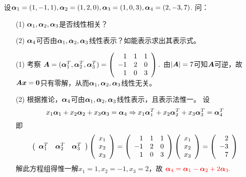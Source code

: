 \begin{frame}
\begin{li}
  设$\boldsymbol{\alpha}_1=(1,-1,1),\boldsymbol{\alpha}_2=(1,2,0),\boldsymbol{\alpha}_3=(1,0,3),\boldsymbol{\alpha}_4=(2,-3,7)$.  问：
  \begin{itemize}
  \item[(1)]$\boldsymbol{\alpha}_1,\boldsymbol{\alpha}_2,\boldsymbol{\alpha}_3$是否线性相关？
  \item[(2)]$\boldsymbol{\alpha}_4$可否由$\boldsymbol{\alpha}_1,\boldsymbol{\alpha}_2,\boldsymbol{\alpha}_3$线性表示？如能表示求出其表示式。
  \end{itemize}
\end{li} \pause 
\begin{jie}
\begin{itemize}
\item[(1)]    考察
  $
  \boldsymbol{A} = (\boldsymbol{\alpha}_1^T, \boldsymbol{\alpha}_2^T, \boldsymbol{\alpha}_3^T) = \left(
  \begin{array}{rrr}
    1&1&1\\
    -1&2&0\\
    1&0&3
  \end{array}
  \right). 
  $ \quad
  由$|\boldsymbol{A}|=7$可知$\boldsymbol{A}$可逆，故$\MA\vx=\M0$只有零解，从而$\boldsymbol{\alpha}_1,\boldsymbol{\alpha}_2,\boldsymbol{\alpha}_3$线性无关。  \pause 
\item[(2)] 根据推论，$\boldsymbol{\alpha}_4$可由$\boldsymbol{\alpha}_1,\boldsymbol{\alpha}_2,\boldsymbol{\alpha}_3$线性表示，且表示法惟一。  设
  $$
  x_1\boldsymbol{\alpha}_1+x_2\boldsymbol{\alpha}_2+x_3\boldsymbol{\alpha}_3=\boldsymbol{\alpha}_4   \Rightarrow
  x_1\boldsymbol{\alpha}_1^T+x_2\boldsymbol{\alpha}_2^T+x_3\boldsymbol{\alpha}_3^T=\boldsymbol{\alpha}_4^T       
  $$
  即$$
  \left(
  \begin{array}{ccc}
    \boldsymbol{\alpha}_1^T &\boldsymbol{\alpha}_2^T& \boldsymbol{\alpha}_3^T  
  \end{array}
  \right) \left(
  \begin{array}{c}
    x_1\\
    x_2\\
    x_3
  \end{array}
  \right)= 
  \left(
  \begin{array}{rrr}
    1&1&1\\
    -1&2&0\\
    1&0&3
  \end{array}
  \right) \left(
  \begin{array}{c}
    x_1\\
    x_2\\
    x_3
  \end{array}
  \right) =  \left(
  \begin{array}{r}
    2\\
    -3\\
    7
  \end{array}
  \right)
  $$  
  解此方程组得惟一解$x_1=1,x_2=-1,x_3=2$，故
  $
  \textcolor{red}{\boldsymbol{\alpha}_4=\boldsymbol{\alpha}_1-\boldsymbol{\alpha}_2+2\boldsymbol{\alpha}_3.}
  $
\end{itemize}
\end{jie}
\end{frame}

